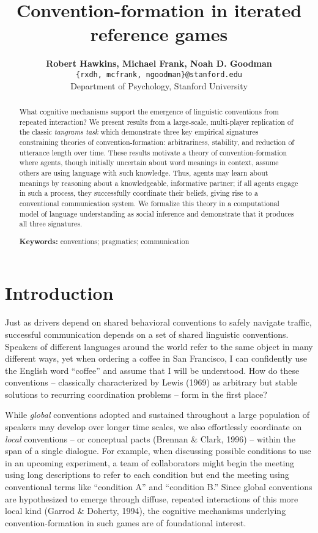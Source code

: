 \documentclass[10pt, letterpaper]{article}
\title{Convention-formation in iterated reference games}
\author{{\large \bf Robert Hawkins, Michael Frank, Noah D. Goodman} \\ \texttt{\{rxdh, mcfrank, ngoodman\}@stanford.edu} \\ Department of Psychology, Stanford University}
\begin{document}
\maketitle

\begin{abstract}
What cognitive mechanisms support the emergence of linguistic
conventions from repeated interaction? We present results from a
large-scale, multi-player replication of the classic \emph{tangrams
task} which demonstrate three key empirical signatures constraining
theories of convention-formation: arbitrariness, stability, and
reduction of utterance length over time. These results motivate a theory
of convention-formation where agents, though initially uncertain about
word meanings in context, assume others are using language with such
knowledge. Thus, agents may learn about meanings by reasoning about a
knowledgeable, informative partner; if all agents engage in such a
process, they successfully coordinate their beliefs, giving rise to a
conventional communication system. We formalize this theory in a
computational model of language understanding as social inference and
demonstrate that it produces all three signatures.

\textbf{Keywords:}
conventions; pragmatics; communication
\end{abstract}

\section{Introduction}\label{introduction}

Just as drivers depend on shared behavioral conventions to safely
navigate traffic, successful communication depends on a set of shared
linguistic conventions. Speakers of different languages around the world
refer to the same object in many different ways, yet when ordering a
coffee in San Francisco, I can confidently use the English word
``coffee'' and assume that I will be understood. How do these
conventions -- classically characterized by Lewis (1969) as arbitrary
but stable solutions to recurring coordination problems -- form in the
first place?

While \emph{global} conventions adopted and sustained throughout a large
population of speakers may develop over longer time scales, we also
effortlessly coordinate on \emph{local} conventions -- or conceptual
pacts (Brennan \& Clark, 1996) -- within the span of a single dialogue.
For example, when discussing possible conditions to use in an upcoming
experiment, a team of collaborators might begin the meeting using long
descriptions to refer to each condition but end the meeting using
conventional terms like ``condition A'' and ``condition B.'' Since
global conventions are hypothesized to emerge through diffuse, repeated
interactions of this more local kind (Garrod \& Doherty, 1994), the
cognitive mechanisms underlying convention-formation in such games are
of foundational interest.
\end{document}
